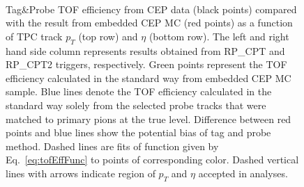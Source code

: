 \begin{figure}[h!]
{\begin{subfigure}[b]{\linewidth}
  \end{subfigure}  
}
\quad
\parbox{0.4725\textwidth}{
  \centering\vspace*{-55pt}
    \begin{subfigure}[b]{\linewidth}
  \end{subfigure}\\[5pt]
		\begin{minipage}[t][0.78\linewidth][t]{\linewidth}\vspace{10pt}
			\caption[Tag\&Probe TOF efficiency from CEP data compared with the result from embedded CEP MC.]%
    {Tag\&Probe TOF efficiency from CEP data (black points) compared with the result from embedded CEP MC (red points) as a function of TPC track $p_{T}$ (top row) and $\eta$ (bottom row). The left and right hand side column represents results obtained from RP\_CPT and RP\_CPT2 triggers, respectively. Green points represent the TOF efficiency calculated in the standard way from embedded CEP MC sample. Blue lines denote the TOF efficiency calculated in the standard way solely from the selected probe tracks that were matched to primary pions at the true level. Difference between red points and blue lines show the potential bias of tag and probe method. Dashed lines are fits of function given by Eq.~\eqref{eq:tofEffFunc} to points of corresponding color. Dashed vertical lines with arrows indicate region of $p_{T}$ and $\eta$ accepted in analyses.}\label{fig:tofEffSyst}%
		\end{minipage}
}%
\end{figure}





